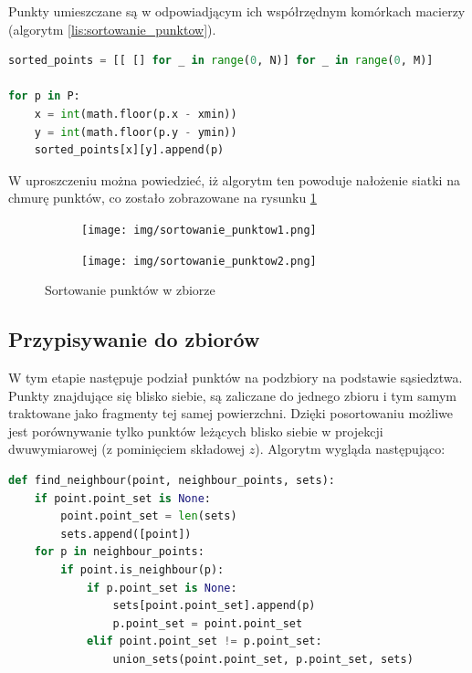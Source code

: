\noindent Punkty umieszczane są w odpowiadjącym ich współrzędnym komórkach macierzy (algorytm \ref{lis:sortowanie_punktow}).

\begin{lstlisting}[frame=L, language=python, caption={Sortowanie punktów}, label={lis:sortowanie_punktow}]
sorted_points = [[ [] for _ in range(0, N)] for _ in range(0, M)]

for p in P:
    x = int(math.floor(p.x - xmin))
    y = int(math.floor(p.y - ymin))
    sorted_points[x][y].append(p)

\end{lstlisting}

W uproszczeniu można powiedzieć, iż algorytm ten powoduje nałożenie siatki na chmurę punktów, co zostało zobrazowane na rysunku \ref{fig:sortowanie_punktow}

\begin{figure}[h!]
	\centering
    \begin{subfigure}[b]{0.3\textwidth}
        \texttt{[image: img/sortowanie\_punktow1.png]}
    \end{subfigure}%
	\quad
    \begin{subfigure}[b]{0.3\textwidth}
        \texttt{[image: img/sortowanie\_punktow2.png]}
    \end{subfigure}%
    \caption{Sortowanie punktów w zbiorze}
    \label{fig:sortowanie_punktow}
\end{figure}

\subsection{Przypisywanie do zbiorów}
W tym etapie następuje podział punktów na podzbiory na podstawie sąsiedztwa. Punkty znajdujące się blisko siebie,
są zaliczane do jednego zbioru i tym samym traktowane jako fragmenty tej samej powierzchni. Dzięki posortowaniu
możliwe jest porównywanie tylko punktów leżących blisko siebie w projekcji dwuwymiarowej (z pominięciem składowej $z$).
Algorytm wygląda następująco:

\begin{lstlisting}[frame=L, language=python, caption={Podział punktów na zbiory w algorytmie naiwnym}, label={lis:podzial_naiwny}]
def find_neighbour(point, neighbour_points, sets):
    if point.point_set is None:
        point.point_set = len(sets)
        sets.append([point])
    for p in neighbour_points:
        if point.is_neighbour(p):
            if p.point_set is None:
                sets[point.point_set].append(p)
                p.point_set = point.point_set
            elif point.point_set != p.point_set:
                union_sets(point.point_set, p.point_set, sets)
\end{lstlisting}

